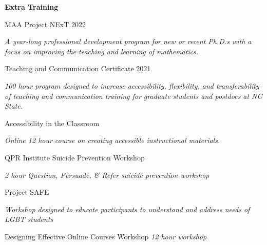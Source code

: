 \documentclass{article}
\begin{document}



\bigskip
\bigskip

\textsf{\textbf{\Large Extra Training}\hrulefill}

\medskip
MAA Project NExT \hfill 2022

\textit{A year-long professional development program for new or recent Ph.D.s with a focus on improving the teaching and learning of mathematics.}

\medskip
Teaching and Communication Certificate \hfill 2021

\textit{100 hour program designed to increase accessibility, flexibility, and transferability of teaching and communication training for graduate students and postdocs at NC State.}

\medskip
Accessibility in the Classroom

\textit{Online 12 hour course on creating accessible instructional materials.}

\medskip
QPR Institute Suicide Prevention Workshop

\textit{2 hour Question, Persuade, \& Refer suicide prevention workshop}

\medskip
Project SAFE

\textit{Workshop designed to educate participants to understand and address needs of LGBT students}

\medskip
Designing Effective Online Courses Workshop
\textit{12 hour workshop}




%
%
\end{document}
